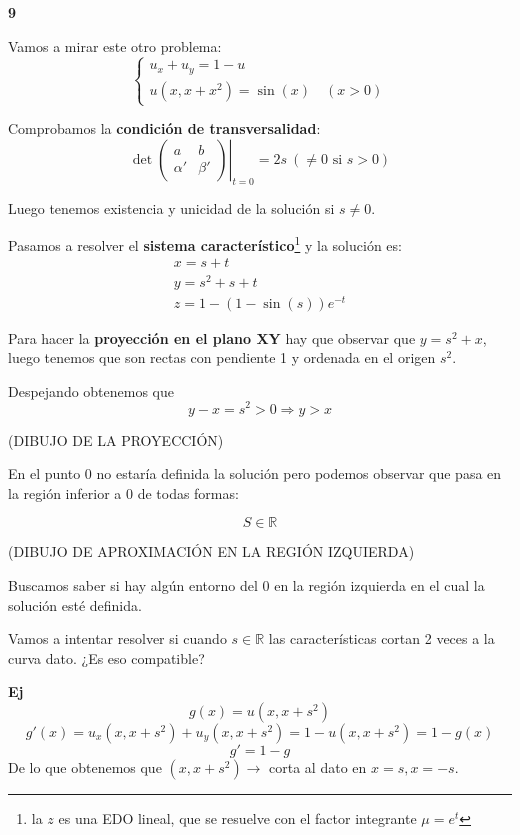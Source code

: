 
	\begin{example}{\bf 9}

		Vamos a mirar este otro problema:
		\[
		\left\{
		\begin{array}{l}
			u_x+ u_y = 1 - u\\
			u(x,x+x^2) = \sin(x) \quad (x>0)
		\end{array}
		\right.
		\]

		Comprobamos la {\bf condición de transversalidad}:
		\[\det \left. \begin{pmatrix}
			a & b \\
			\alpha' & \beta'
		\end{pmatrix} \right|_{t=0} = 2s \ (\neq 0 \text{ si } s > 0) \]

		Luego tenemos existencia y unicidad de la solución si $s\neq0$.

		Pasamos a resolver el {\bf sistema característico}\footnote{la $z$ es una EDO lineal, que se resuelve con el factor integrante $\mu = e^t$} y la solución es:
		\[
		\begin{array}{l}
		x = s+t \\
		y = s^2 + s + t \\
		z = 1 - (1 - \sin(s) )e^{-t}
		\end{array}
		\]

		Para hacer la {\bf proyección en el plano XY} hay que observar que $y = s^2 + x $, luego tenemos que son rectas con pendiente 1 y ordenada en el origen $s^2$.

		Despejando obtenemos que
		\[y-x = s^2 > 0 \Rightarrow y > x\]

		(DIBUJO DE LA PROYECCIÓN)

		En el punto 0 no estaría definida la solución pero podemos observar que pasa en la región inferior a 0 de todas formas:

		$$S \in \mathbb{R}$$

		(DIBUJO DE APROXIMACIÓN EN LA REGIÓN IZQUIERDA)

		Buscamos saber si hay algún entorno del 0 en la región izquierda en el cual la solución esté definida.

		Vamos a intentar resolver si cuando $s \in \mathbb{R}$ las características cortan 2 veces a la curva dato. ¿Es eso compatible?

		\textbf{Ej}
		\[g(x) = u(x,x+s^2)\]
		\[g'(x) = u_x (x,x+s^2) + u_y(x,x+s^2) = 1 - u(x,x+s^2) = 1 - g(x)\]
		\[g' = 1-g\]
		De lo que obtenemos que $(x,x+s^2) \rightarrow $ corta al dato en $x=s, x=-s$.


\end{example}

